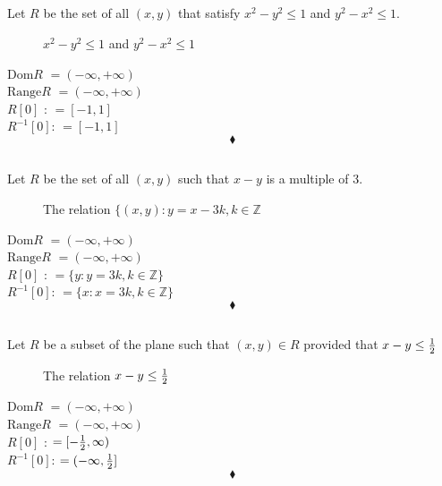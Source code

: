 \subsection{}
\begin{tcolorbox}
 Let $R$ be the set of all $(x,y)$ that satisfy $x^2-y^2\le 1$ and $y^2-x^2 \le 1$.
\end{tcolorbox}
\begin{figure}[H]%
    \centering
    
\caption{$x^2-y^2\le 1$ and $y^2-x^2 \le 1$}
\label{fig:fig_p8b}
\end{figure}
$$ $$
\textbf{$\text{Dom}R$} $=(-\infty,+\infty)$\\
\textbf{$\text{Range} R$} $=(-\infty,+\infty)$\\
\textbf{$R[0]$ }: $=[-1,1]$\\
\textbf{$R^{-1}[0]$}: $=[-1,1]$\\
$$\blacklozenge$$

\subsection{}
\begin{tcolorbox}
 Let $R$ be the set of all $(x,y)$ such that $x-y$ is a multiple of 3.
\end{tcolorbox}
\begin{figure}[H]%
    \centering
    
\caption{The relation $\{(x,y): y=x-3k, k\in \mathbb{Z}$}
\label{fig:fig_p8b}
\end{figure}
$$ $$
\textbf{$\text{Dom}R$} $=(-\infty,+\infty)$\\
\textbf{$\text{Range} R$} $=(-\infty,+\infty)$\\
\textbf{$R[0]$ }: $=\{y: y=3k, k\in\mathbb{Z}\}$\\
\textbf{$R^{-1}[0]$}: $=\{x: x=3k, k\in\mathbb{Z}\}$\\
$$\blacklozenge$$

\subsection{}
\begin{tcolorbox}
 Let $R$ be a subset of the plane such that $(x,y)\in R$ provided that $x-y\le \frac{1}{2}$
\end{tcolorbox}
\begin{figure}[H]%
    \centering
    
\caption{The relation $x-y\le \frac{1}{2}$}
\label{fig:fig_p8b}
\end{figure}
$$ $$
\textbf{$\text{Dom}R$} $=(-\infty,+\infty)$\\
\textbf{$\text{Range} R$} $=(-\infty,+\infty)$\\
\textbf{$R[0]$ }:  $=[-\frac{1}{2},\infty)$\\
\textbf{$R^{-1}[0]$}:  $=(-\infty,\frac{1}{2}]$\\
$$\blacklozenge$$
\newpage

